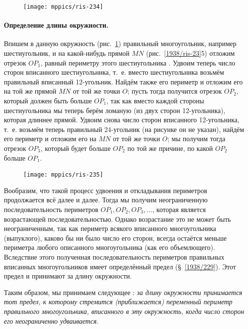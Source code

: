 \documentclass[oneside]{book}
\begin{document}
\begin{figure}
\centering
\texttt{[image: mppics/ris-234]}
\caption{}\label{1938/ris-234}
\end{figure}

\paragraph{Определение длины окружности.}\label{1938/234}
Впишем в данную окружность (рис.~\ref{1938/ris-234}) правильный многоугольник, например шестиугольник, и на какой-нибудь прямой $MN$ (рис.~\ref{1938/ris-23}5) отложим отрезок $OP_1$, равный периметру этого шестиугольника%
.
Удвоим теперь число сторон вписанного шестиугольника, т.~е.
вместо шестиугольника возьмём правильный вписанный 12-угольник.
Найдём также его периметр и отложим его на той же прямой $MN$ от той же точки $O$;
пусть тогда получится отрезок $OP_2$, который должен быть больше $OP_1$, так как вместо каждой стороны шестиугольника мы теперь берём ломаную (из двух сторон 12-угольника), которая длиннее прямой.
Удвоим снова число сторон вписанного 12-угольника, т.~е. возьмём теперь правильный 24-угольник (на рисунке он не указан), найдём его периметр и отложим его на $MN$ от той же точки $O$; мы получим тогда отрезок $OP_3$, который будет больше $OP_2$ по той же причине, по какой $OP_2$ больше $OP_1$.

\begin{figure}[h!]
\centering
\texttt{[image: mppics/ris-235]}
\caption{}\label{1938/ris-235}
\end{figure}

Вообразим, что такой процесс удвоения и откладывания периметров продолжается всё далее и далее.
Тогда мы получим неограниченную последовательность периметров $OP_1, OP_2, OP_3,\dots$, которая является возрастающей последовательностью.
Однако возрастание это не может быть неограниченным, так как периметр всякого вписанного многоугольника (выпуклого), каково бы ни было число его сторон, всегда остаётся меньше периметра любого описанного многоугольника (как его объемлющего).
Вследствие этого полученная последовательность периметров правильных вписанных многоугольников имеет определённый предел (§~\ref{1938/229}). %
Этот предел и принимают за длину окружности.

Таким образом, мы принимаем следующее :
\emph{за длину окружности принимается тот предел, к которому стремится (приближается) переменный %
периметр правильного многоугольника, вписанного в эту окружность, когда число сторон его неограниченно удваивается.}
\end{document}
